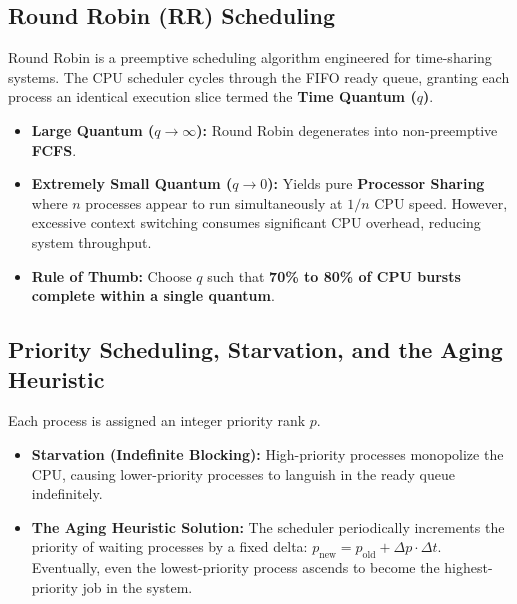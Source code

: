 \subsection{Round Robin (RR) Scheduling}
Round Robin is a preemptive scheduling algorithm engineered for time-sharing systems. The CPU scheduler cycles through the FIFO ready queue, granting each process an identical execution slice termed the \textbf{Time Quantum ($q$)}.
\begin{itemize}
    \item \textbf{Large Quantum ($q \to \infty$):} Round Robin degenerates into non-preemptive \textbf{FCFS}.
    \item \textbf{Extremely Small Quantum ($q \to 0$):} Yields pure \textbf{Processor Sharing} where $n$ processes appear to run simultaneously at $1/n$ CPU speed. However, excessive context switching consumes significant CPU overhead, reducing system throughput.
    \item \textbf{Rule of Thumb:} Choose $q$ such that \textbf{70\% to 80\% of CPU bursts complete within a single quantum}.
\end{itemize}

\subsection{Priority Scheduling, Starvation, and the Aging Heuristic}
Each process is assigned an integer priority rank $p$.
\begin{itemize}
    \item \textbf{Starvation (Indefinite Blocking):} High-priority processes monopolize the CPU, causing lower-priority processes to languish in the ready queue indefinitely.
    \item \textbf{The Aging Heuristic Solution:} The scheduler periodically increments the priority of waiting processes by a fixed delta: $p_{\text{new}} = p_{\text{old}} + \Delta p \cdot \Delta t$. Eventually, even the lowest-priority process ascends to become the highest-priority job in the system.
\end{itemize}

